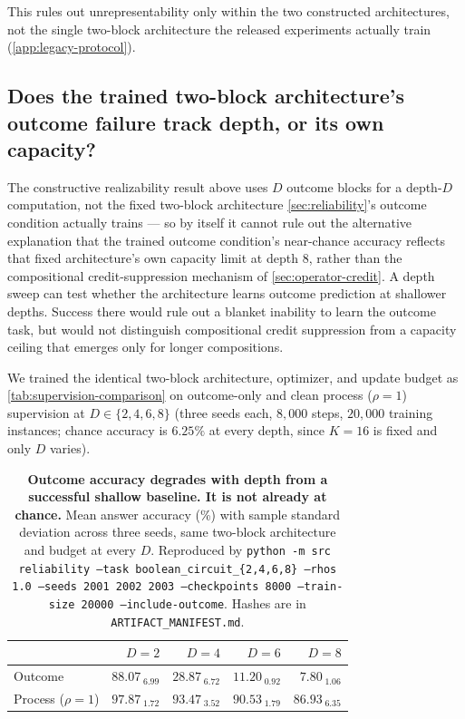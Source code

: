 This rules out unrepresentability only within the two constructed
architectures, not the single two-block architecture the released
experiments actually train (\cref{app:legacy-protocol}).

\subsection{Does the trained two-block architecture's outcome failure track depth, or its own capacity?}
\label{app:depth-capacity}

The constructive realizability result above uses $D$ outcome blocks for a
depth-$D$ computation, not the fixed two-block architecture
\cref{sec:reliability}'s outcome condition actually trains --- so by
itself it cannot rule out the alternative explanation that the trained
outcome condition's near-chance accuracy reflects that fixed
architecture's own capacity limit at depth $8$, rather than the
compositional credit-suppression mechanism of
\cref{sec:operator-credit}. A depth sweep can test whether the architecture
learns outcome prediction at shallower depths. Success there would rule
out a blanket inability to learn the outcome task, but would not distinguish
compositional credit suppression from a capacity ceiling that emerges
only for longer compositions.

We trained the identical two-block architecture, optimizer, and update
budget as \cref{tab:supervision-comparison} on outcome-only and clean
process ($\rho=1$) supervision at $D\in\{2,4,6,8\}$ (three seeds each,
$8{,}000$ steps, $20{,}000$ training instances; chance accuracy is
$6.25\%$ at every depth, since $K=16$ is fixed and only $D$ varies).

\begin{table}[htbp]
\centering
\small
\begin{tabular}{lrrrr}
\toprule
& $D=2$ & $D=4$ & $D=6$ & $D=8$ \\
\midrule
Outcome & $88.07_{\;6.99}$ & $28.87_{\;6.72}$ & $11.20_{\;0.92}$ & $7.80_{\;1.06}$ \\
Process ($\rho=1$) & $97.87_{\;1.72}$ & $93.47_{\;3.52}$ & $90.53_{\;1.79}$ & $86.93_{\;6.35}$ \\
\bottomrule
\end{tabular}
\caption{\textbf{Outcome accuracy degrades with depth from a successful
shallow baseline. It is not already at chance.} Mean answer accuracy (\%)
with sample standard deviation across three seeds, same two-block
architecture and budget at every $D$. Reproduced by
\texttt{python -m src reliability --task boolean\_circuit\_\{2,4,6,8\}
--rhos 1.0 --seeds 2001 2002 2003 --checkpoints 8000 --train-size 20000
--include-outcome}. Hashes are in \texttt{ARTIFACT\_MANIFEST.md}.}
\label{tab:depth-capacity}
\end{table}

